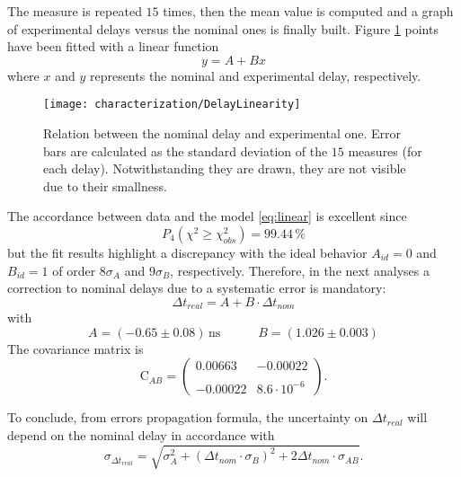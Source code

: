 The measure is repeated $15$ times, then the mean value is computed and a graph of experimental delays versus the nominal ones is finally built. Figure \ref{fig:delaylinearity} points have been fitted with a linear function
\begin{equation}\label{eq:linear}
y=A+Bx
\end{equation}
where $x$ and $y$ represents the nominal and experimental delay, respectively.
\begin{figure}[!htp]
	\centering
	\texttt{[image: characterization/DelayLinearity]}
	\caption{Relation between the nominal delay and experimental one. Error bars are calculated as the standard deviation of the $15$ measures (for each delay). Notwithstanding they are drawn, they are not visible due to their smallness.} \label{fig:delaylinearity}
\end{figure}
The accordance between data and the model \eqref{eq:linear} is excellent since
\begin{equation}
P_4\left(\chi^2\geq\chi_{obs}^2\right)=99.44\,\%
\end{equation}
but the fit results highlight a discrepancy with the ideal behavior $A_{id}=0$ and $B_{id}=1$ of order $8\sigma_A$ and $9\sigma_B$, respectively. Therefore, in the next analyses a correction to nominal delays due to a systematic error is mandatory:
\begin{equation} \label{correction}
\Delta t_{real} = A + B\cdot\Delta t_{nom}
\end{equation}
with
\begin{equation}
A=\left(-0.65\pm 0.08\right)\,\si{\nano\second}\qquad\quad B=\left(1.026\pm 0.003\right)
\end{equation}
The covariance matrix is
\begin{equation}
\textrm{C}_{AB}=\left(
\begin{array}{cc}
0.00663 & -0.00022\\\\
-0.00022 & 8.6\cdot 10^{-6}
\end{array}
\right).
\end{equation}

To conclude, from errors propagation formula, the uncertainty on $\Delta t_{real}$ will depend on the nominal delay in accordance with
\begin{equation} \label{err_correction}
\sigma_{\Delta t_{real}} = \sqrt{\sigma_A^2 + \left(\Delta t_{nom} \cdot \sigma_B\right)^2 + 2\Delta t_{nom}\cdot\sigma_{AB}  }.
\end{equation}

